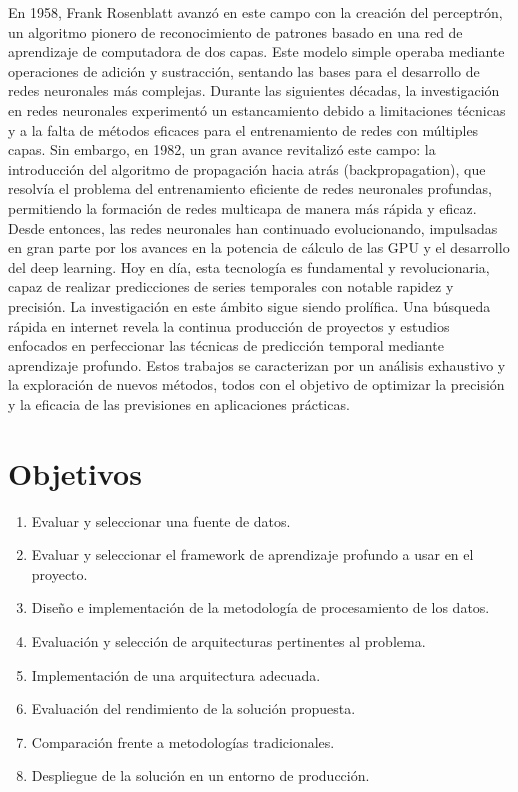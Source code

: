 En 1958, Frank Rosenblatt avanzó en este campo con la creación del perceptrón, un algoritmo pionero de reconocimiento de patrones basado en una red de aprendizaje de computadora de dos capas. Este modelo simple operaba mediante operaciones de adición y sustracción, sentando las bases para el desarrollo de redes neuronales más complejas.
Durante las siguientes décadas, la investigación en redes neuronales experimentó un estancamiento debido a limitaciones técnicas y a la falta de métodos eficaces para el entrenamiento de redes con múltiples capas. Sin embargo, en 1982, un gran avance revitalizó este campo: la introducción del algoritmo de propagación hacia atrás (backpropagation), que resolvía el problema del entrenamiento eficiente de redes neuronales profundas, permitiendo la formación de redes multicapa de manera más rápida y eficaz.
Desde entonces, las redes neuronales han continuado evolucionando, impulsadas en gran parte por los avances en la potencia de cálculo de las GPU y el desarrollo del deep learning. Hoy en día, esta tecnología es fundamental y revolucionaria, capaz de realizar predicciones de series temporales con notable rapidez y precisión.
La investigación en este ámbito sigue siendo prolífica. Una búsqueda rápida en internet revela la continua producción de proyectos y estudios enfocados en perfeccionar las técnicas de predicción temporal mediante aprendizaje profundo. Estos trabajos se caracterizan por un análisis exhaustivo y la exploración de nuevos métodos, todos con el objetivo de optimizar la precisión y la eficacia de las previsiones en aplicaciones prácticas.

\section{Objetivos}

\begin{enumerate}[label=\arabic*.] 
    \item Evaluar y seleccionar una fuente de datos.
    \item Evaluar y seleccionar el framework de aprendizaje profundo a usar en el proyecto.
    \item Diseño e implementación de la metodología de procesamiento de los datos.
    \item Evaluación y selección de arquitecturas pertinentes al problema.
    \item Implementación de una arquitectura adecuada.
    \item Evaluación del rendimiento de la solución propuesta.
    \item Comparación frente a metodologías tradicionales.
    \item Despliegue de la solución en un entorno de producción.
\end{enumerate}

\newpage
